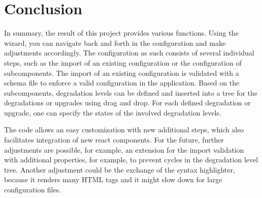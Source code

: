 \chapter{Conclusion}

In summary, the result of this project provides various functions. Using the wizard, you can navigate back and forth in the configuration and make adjustments accordingly. The configuration as such consists of several individual steps, such as the import of an existing configuration or the configuration of subcomponents. The import of an existing configuration is validated with a schema file to enforce a valid configuration in the application. Based on the subcomponents, degradation levels can be defined and inserted into a tree for the degradations or upgrades using drag and drop. For each defined degradation or upgrade, one can specify the states of the involved degradation levels.

The code allows an easy customization with new additional steps, which also facilitates integration of new react components. For the future, further adjustments are possible, for example, an extension for the import validation with additional properties, for example, to prevent cycles in the degradation level tree. Another adjustment could be the exchange of the syntax highlighter, because it renders many HTML tags and it might slow down for large configuration files.
